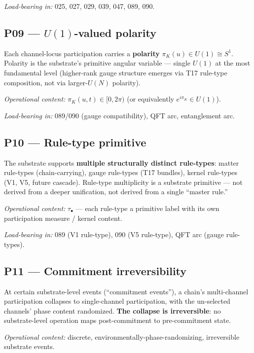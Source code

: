 \documentclass[11pt,a4paper]{article}
\begin{document}
\emph{Load-bearing in:} 025, 027, 029, 039, 047, 089, 090.

\subsection*{P09 --- $U(1)$-valued polarity}

Each channel-locus participation carries a \textbf{polarity} $\pi_K(u) \in U(1) \cong S^1$. Polarity is the substrate's primitive angular variable --- single $U(1)$ at the most fundamental level (higher-rank gauge structure emerges via T17 rule-type composition, not via larger-$U(N)$ polarity).

\emph{Operational content:} $\pi_K(u, t) \in [0, 2\pi)$ (or equivalently $e^{i\pi_K} \in U(1)$).

\emph{Load-bearing in:} 089/090 (gauge compatibility), QFT arc, entanglement arc.

\subsection*{P10 --- Rule-type primitive}

The substrate supports \textbf{multiple structurally distinct rule-types}: matter rule-types (chain-carrying), gauge rule-types (T17 bundles), kernel rule-types (V1, V5, future cascade). Rule-type multiplicity is a substrate primitive --- not derived from a deeper unification, not derived from a single ``master rule.''

\emph{Operational content:} $\tau_\bullet$ --- each rule-type a primitive label with its own participation measure / kernel content.

\emph{Load-bearing in:} 089 (V1 rule-type), 090 (V5 rule-type), QFT arc (gauge rule-types).

\subsection*{P11 --- Commitment irreversibility}

At certain substrate-level events (``commitment events''), a chain's multi-channel participation collapses to single-channel participation, with the un-selected channels' phase content randomized. \textbf{The collapse is irreversible}: no substrate-level operation maps post-commitment to pre-commitment state.

\emph{Operational content:} discrete, environmentally-phase-randomizing, irreversible substrate events.
\end{document}
